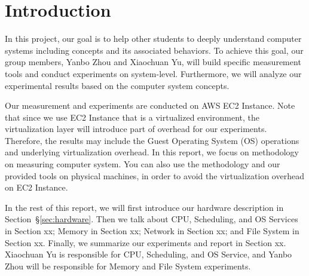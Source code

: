 \section{Introduction}
\label{sec:intro}
In this project, our goal is to help other students to deeply understand computer systems including concepts and its associated behaviors. To achieve this goal, our group members, Yanbo Zhou and Xiaochuan Yu, will build specific measurement tools and conduct experiments on system-level. Furthermore, we will analyze our experimental results based on the computer system concepts.

Our measurement and experiments are conducted on AWS EC2 Instance. Note that since we use EC2 Instance that is a virtualized environment, the virtualization layer will introduce part of overhead for our experiments. Therefore, the results may include the Guest Operating System (OS) operations and underlying virtualization overhead. In this report, we focus on methodology on measuring computer system. You can also use the methodology and our provided tools on physical machines, in order to avoid the virtualization overhead on EC2 Instance.

In the rest of this report, we will first introduce our hardware description in Section~{\S\ref{sec:hardware}}. Then we talk about CPU, Scheduling, and OS Services in Section xx; Memory in Section xx; Network in Section xx; and File System in Section xx. Finally, we summarize our experiments and report in Section xx. Xiaochuan Yu is responsible for CPU, Scheduling, and OS Service, and Yanbo Zhou will be responsible for Memory and File System experiments.
